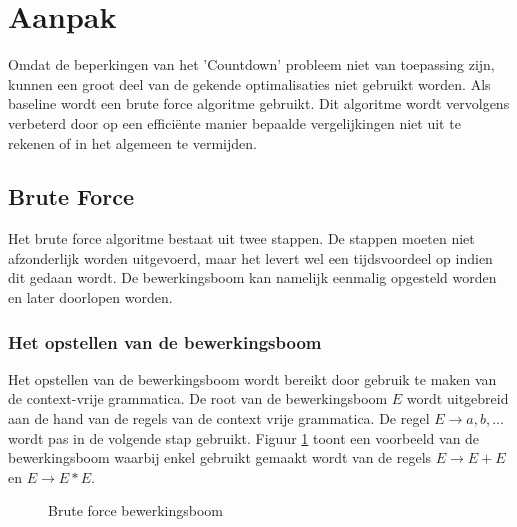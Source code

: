 \documentclass[Main.tex]{subfiles}
\begin{document}
\section{Aanpak}
Omdat de beperkingen van het 'Countdown' probleem niet van toepassing zijn, kunnen een groot deel van de gekende optimalisaties niet gebruikt worden. Als baseline wordt een brute force algoritme gebruikt. Dit algoritme wordt vervolgens verbeterd door op een effici\"ente manier bepaalde vergelijkingen niet uit te rekenen of in het algemeen te vermijden.
\subsection{Brute Force}
Het brute force algoritme bestaat uit twee stappen. De stappen moeten niet afzonderlijk worden uitgevoerd, maar het levert wel een tijdsvoordeel op indien dit gedaan wordt. De bewerkingsboom kan namelijk eenmalig opgesteld worden en later doorlopen worden.
\subsubsection*{Het opstellen van de bewerkingsboom}
Het opstellen van de bewerkingsboom wordt bereikt door gebruik te maken van de context-vrije grammatica. De root van de bewerkingsboom $E$ wordt uitgebreid aan de hand van de regels van de context vrije grammatica. De regel $E \rightarrow a,b,\dotsc$ wordt pas in de volgende stap gebruikt. Figuur \ref{fig:bewerkingsboom} toont een voorbeeld van de bewerkingsboom waarbij enkel gebruikt gemaakt wordt van de regels $E \rightarrow E+E$ en $E \rightarrow E \ast E$.
\begin{figure}[!htb]
\centering
{}
\caption{Brute force bewerkingsboom} \label{fig:bewerkingsboom}
\end{figure}
\end{document}
